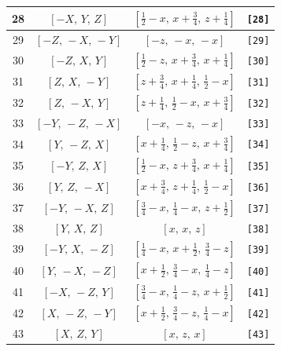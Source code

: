 \documentclass[fleqn,8pt]{jsarticle}
\begin{document}
\begin{longtable}{cccc}
28 & $\left[ - X,\, Y,\, Z \right]$ & $\left[ \frac{1}{2} - x,\, x + \frac{3}{4},\, z + \frac{1}{4} \right]$ & {\tt [28]} \\ \hline
29 & $\left[ - Z,\, - X,\, - Y \right]$ & $\left[ - z,\, - x,\, - x \right]$ & {\tt [29]} \\ \hline
30 & $\left[ - Z,\, X,\, Y \right]$ & $\left[ \frac{1}{2} - z,\, x + \frac{3}{4},\, x + \frac{1}{4} \right]$ & {\tt [30]} \\ \hline
31 & $\left[ Z,\, X,\, - Y \right]$ & $\left[ z + \frac{3}{4},\, x + \frac{1}{4},\, \frac{1}{2} - x \right]$ & {\tt [31]} \\ \hline
32 & $\left[ Z,\, - X,\, Y \right]$ & $\left[ z + \frac{1}{4},\, \frac{1}{2} - x,\, x + \frac{3}{4} \right]$ & {\tt [32]} \\ \hline
33 & $\left[ - Y,\, - Z,\, - X \right]$ & $\left[ - x,\, - z,\, - x \right]$ & {\tt [33]} \\ \hline
34 & $\left[ Y,\, - Z,\, X \right]$ & $\left[ x + \frac{1}{4},\, \frac{1}{2} - z,\, x + \frac{3}{4} \right]$ & {\tt [34]} \\ \hline
35 & $\left[ - Y,\, Z,\, X \right]$ & $\left[ \frac{1}{2} - x,\, z + \frac{3}{4},\, x + \frac{1}{4} \right]$ & {\tt [35]} \\ \hline
36 & $\left[ Y,\, Z,\, - X \right]$ & $\left[ x + \frac{3}{4},\, z + \frac{1}{4},\, \frac{1}{2} - x \right]$ & {\tt [36]} \\ \hline
37 & $\left[ - Y,\, - X,\, Z \right]$ & $\left[ \frac{3}{4} - x,\, \frac{1}{4} - x,\, z + \frac{1}{2} \right]$ & {\tt [37]} \\ \hline
38 & $\left[ Y,\, X,\, Z \right]$ & $\left[ x,\, x,\, z \right]$ & {\tt [38]} \\ \hline
39 & $\left[ - Y,\, X,\, - Z \right]$ & $\left[ \frac{1}{4} - x,\, x + \frac{1}{2},\, \frac{3}{4} - z \right]$ & {\tt [39]} \\ \hline
40 & $\left[ Y,\, - X,\, - Z \right]$ & $\left[ x + \frac{1}{2},\, \frac{3}{4} - x,\, \frac{1}{4} - z \right]$ & {\tt [40]} \\ \hline
41 & $\left[ - X,\, - Z,\, Y \right]$ & $\left[ \frac{3}{4} - x,\, \frac{1}{4} - z,\, x + \frac{1}{2} \right]$ & {\tt [41]} \\ \hline
42 & $\left[ X,\, - Z,\, - Y \right]$ & $\left[ x + \frac{1}{2},\, \frac{3}{4} - z,\, \frac{1}{4} - x \right]$ & {\tt [42]} \\ \hline
43 & $\left[ X,\, Z,\, Y \right]$ & $\left[ x,\, z,\, x \right]$ & {\tt [43]} \\ \hline

\end{longtable}
\end{document}
